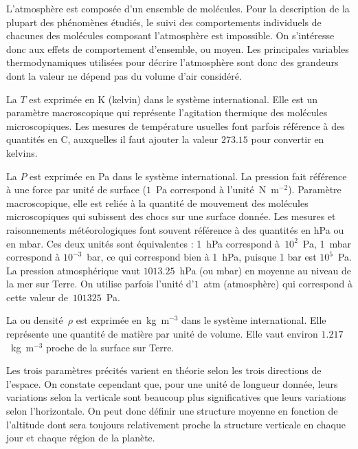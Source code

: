 \sk
L'atmosphère est composée d'un ensemble de molécules. Pour la description de la plupart des phénomènes étudiés, le suivi des comportements individuels de chacunes des molécules composant l'atmosphère est impossible. On s'intéresse donc aux effets de comportement d'ensemble, ou moyen. Les principales variables thermodynamiques utilisées pour décrire l'atmosphère sont donc des grandeurs  dont la valeur ne dépend pas du volume d'air considéré.
\begin{finger}
\item La  $T$ est exprimée en K (kelvin) dans le système international. Elle est un paramètre macroscopique qui représente l'agitation thermique des molécules microscopiques. Les mesures de température usuelles font parfois référence à des quantités en \deg C, auxquelles il faut ajouter la valeur $273.15$ pour convertir en kelvins.
\item La  $P$ est exprimée en Pa dans le système international. La pression fait référence à une force par unité de surface ($1$~Pa correspond à l'unité~N~m$^{-2}$). Paramètre macroscopique, elle est reliée à la quantité de mouvement des molécules microscopiques qui subissent des chocs sur une surface donnée. Les mesures et raisonnements météorologiques font souvent référence à des quantités en hPa ou en mbar. Ces deux unités sont équivalentes : 1~hPa correspond à~$10^{2}$~Pa, 1~mbar correspond à $10^{-3}$~bar, ce qui correspond bien à 1~hPa, puisque 1 bar est $10^{5}$~Pa. La pression atmosphérique vaut $1013.25$~hPa (ou mbar) en moyenne au niveau de la mer sur Terre. On utilise parfois l'unité d'$1$~atm (atmosphère) qui correspond à cette valeur de~$101325$~Pa.
\item La  ou densité~$\rho$ est exprimée en~kg~m$^{-3}$ dans le système international. Elle représente une quantité de matière par unité de volume. Elle vaut environ $1.217$~kg~m$^{-3}$ proche de la surface sur Terre.
\end{finger}

\sk
Les trois paramètres précités varient en théorie selon les trois directions de l'espace. On constate cependant que, pour une unité de longueur donnée, leurs variations selon la verticale sont beaucoup plus significatives que leurs variations selon l'horizontale. On peut donc définir une structure moyenne en fonction de l'altitude dont sera toujours relativement proche la structure verticale en chaque jour et chaque région de la planète. 

